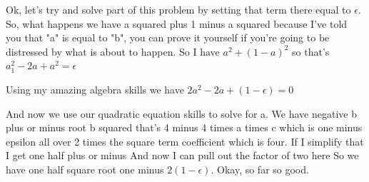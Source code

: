 \documentclass[]{article}
\begin{document}
Ok, let's try and solve
part of this problem
by setting that term there equal to $\epsilon$.
So, what happens we have a squared
plus 1 minus a squared
because I've told you that "a" is equal to "b",
you can prove it yourself if you're going
to be distressed by what is about to happen.
So I have $a^2 + (1-a)^2$ so that's
$a^2_1-2a+a^2=\epsilon$

Using my amazing algebra skills we have
$2a^2-2a+(1-\epsilon)  = 0$

And now we use our quadratic equation
skills to solve for a.
We have negative b plus or minus
root b squared that's 4
minus 4 times a times c
which is one minus epsilon all over
2 times the square term coefficient
which is four.
If I simplify that I get one half plus or minus
And now I can pull out the factor of two here
So we have one half square root one minus
$2(1-\epsilon)$.
Okay, so far so good.
\end{document}
